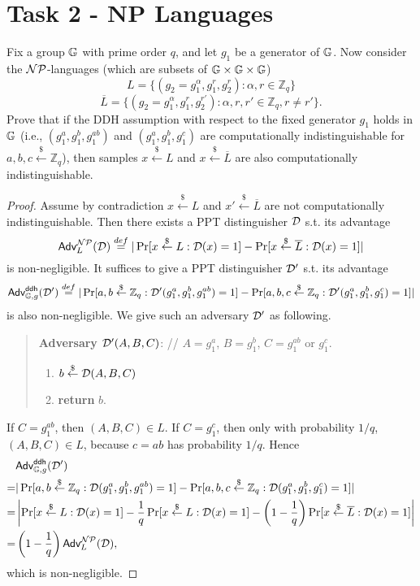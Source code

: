 \documentclass[12pt]{article}
\newcommand{\eqdef}{\stackrel{def}{=}}
\newcommand{\Z}{\mathbb{Z}}
\newcommand{\getsr}{\stackrel{\$}{\gets}}
\newcommand{\Adv}{\textsf{Adv}}
\theoremstyle{definition}
\begin{document}
\section{Task 2 - NP Languages}
Fix a group $\mathbb{G}$ with prime order $q$, and let $g_1$ be a generator of $\mathbb{G}$. Now consider the $\mathcal{NP}$-languages (which are subsets of $\mathbb{G} \times \mathbb{G} \times \mathbb{G}$)
$$L = \{(g_2= g_1^\alpha, g_1^r, g_2^r) : \alpha, r \in \Z_q\}$$
$$\overline{L} = \{(g_2 = g_1^\alpha, g_1^r, g_2^{r'}) : \alpha, r, r' \in \Z_q, r\not= r' \}.$$
Prove that if the DDH assumption with respect to the fixed generator $g_1$ holds in $\mathbb{G}$ (i.e., $(g_1^a, g_1^b, g_1^{ab})$ and $(g_1^a, g_1^b, g_1^c)$ are computationally indistinguishable for $a,b,c \getsr \Z_q$), then samples $x \getsr L$ and $x \getsr \overline{L}$ are also computationally indistinguishable.
\begin{proof}
Assume by contradiction $x \getsr L$ and $x' \getsr \overline{L}$ are not computationally indistinguishable. Then there exists a PPT distinguisher $\mathcal{D}$ s.t. its advantage
$$\Adv_L^{\NP}(\D) \eqdef |\Pr[x \getsr L : \D(x) = 1] - \Pr[x \getsr \overline{L} : \D(x) = 1]|$$
is non-negligible. It suffices to give a PPT distinguisher $\mathcal{D}'$ s.t. its advantage
$$\Adv_{\G,g}^{\ddh}(\D') \eqdef |\Pr[a,b \getsr \Z_q : \D'(g_1^a, g_1^b, g_1^{ab}) = 1] - \Pr[a,b,c \getsr \Z_q : \D'(g_1^a, g_1^b, g_1^c) = 1]|$$
is also non-negligible.
We give such an adversary $\mathcal{D}'$ as following.
\begin{quote}
{\bf Adversary} $\mathcal{D}' (A, B, C)$: // $A = g_1^a$, $B = g_1^b$, $C = g_1^{ab}$ or $g_1^c$.
\begin{enumerate}
\item $b \getsr \D(A, B, C)$
\item {\bf return} $b$.
\end{enumerate}
\end{quote}
If $C = g_1^{ab}$, then $(A, B, C) \in L$. If $C = g_1^c$, then only with probability $1/q$, $(A, B, C) \in L$, because $c = ab$ has probability $1/q$. Hence
$$\begin{aligned}
& \Adv_{\G,g}^{\ddh}(\D')\\
=& |\Pr[a,b \getsr \Z_q : \D(g_1^a, g_1^b, g_1^{ab}) = 1] - \Pr[a,b,c \getsr \Z_q : \D(g_1^a, g_1^b, g_1^c) = 1]| \\
=& \left|\Pr[x \getsr L : \D(x) = 1] - \frac{1}{q}\Pr[x \getsr L : \D(x) = 1] - \left(1-\frac{1}{q}\right)\Pr[x \getsr \overline{L} : \D(x) = 1]\right| \\
=& \left(1-\frac{1}{q}\right) \Adv_L^{\NP}(\D),
\end{aligned}$$
which is non-negligible.
\end{proof}
\end{document}
